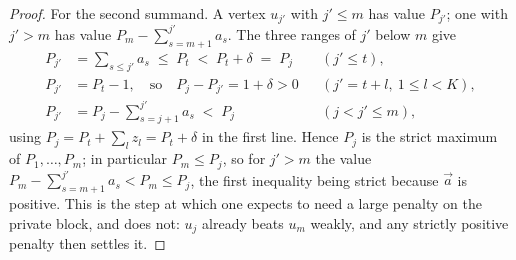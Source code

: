 \documentclass[11pt, a4paper, abstract=yes]{scrartcl}
\theoremstyle{definition}
\theoremstyle{remark}
\theoremstyle{plain}
\begin{document}
\begin{proof}
For the second summand. A vertex \(u_{j'}\) with \(j'\le m\) has value \(P_{j'}\); one with
\(j'>m\) has value \(P_m-\sum_{s=m+1}^{j'}a_s\). The three ranges of \(j'\) below \(m\) give
\begin{align}
  P_{j'} &= \sum_{s\le j'}a_s \;\le\; P_t \;<\; P_t+\delta \;=\; P_j
    & &(j'\le t), \label{eq:gapK-P1}\\
  P_{j'} &= P_t-1, \quad\text{so}\quad P_j-P_{j'}=1+\delta>0
    & &(j'=t+l,\ 1\le l<K), \label{eq:gapK-P2}\\
  P_{j'} &= P_j-\sum_{s=j+1}^{j'}a_s \;<\; P_j
    & &(j<j'\le m), \label{eq:gapK-P3}
\end{align}
using \(P_j=P_t+\sum_lz_l=P_t+\delta\) in the first line. Hence \(P_j\) is the strict maximum of \(P_1,\dots,P_m\); in
particular \(P_m\le P_j\), so for \(j'>m\) the value \(P_m-\sum_{s=m+1}^{j'}a_s<P_m\le P_j\), the
first inequality being strict because \(\vec a\) is positive. This is the step at which one expects
to need a large penalty on the private block, and does not: \(u_j\) already beats \(u_m\) weakly, and
any strictly positive penalty then settles it.
\end{proof}
\end{document}
